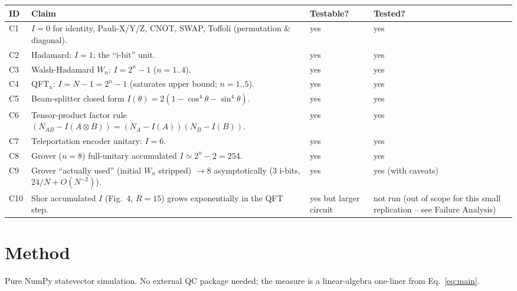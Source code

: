 \documentclass[11pt]{article}
\begin{document}
\begin{longtable}{p{} p{} p{} p{}}
\toprule
\textbf{ID} & \textbf{Claim} & \textbf{Testable?} & \textbf{Tested?} \\
\midrule
C1 & $I=0$ for identity, Pauli-X/Y/Z, CNOT, SWAP, Toffoli (permutation \& diagonal). & yes & yes \\
C2 & Hadamard: $I=1$; the ``i-bit'' unit. & yes & yes \\
C3 & Walsh-Hadamard $W_n$: $I = 2^n-1$ ($n=1..4$). & yes & yes \\
C4 & QFT$_n$: $I = N-1 = 2^n-1$ (saturates upper bound; $n=1..5$). & yes & yes \\
C5 & Beam-splitter closed form $I(\theta) = 2(1-\cos^4\theta-\sin^4\theta)$. & yes & yes \\
C6 & Tensor-product factor rule $(N_{AB} - I(A\otimes B)) = (N_A - I(A))(N_B - I(B))$. & yes & yes \\
C7 & Teleportation encoder unitary: $I = 6$. & yes & yes \\
C8 & Grover ($n=8$) full-unitary accumulated $I \simeq 2^n-2 = 254$. & yes & yes \\
C9 & Grover ``actually used'' (initial $W_n$ stripped) $\to 8$ asymptotically ($3$ i-bits, $24/N + O(N^{-2})$). & yes & yes (with caveats) \\
C10 & Shor accumulated $I$ (Fig.~4, $R=15$) grows exponentially in the QFT step. & yes but larger circuit & not run (out of scope for this small replication -- see Failure Analysis) \\
\bottomrule
\end{longtable}

\section{Method}

Pure NumPy statevector simulation. No external QC package needed; the measure
is a linear-algebra one-liner from Eq.~\ref{eq:main}.
\end{document}
